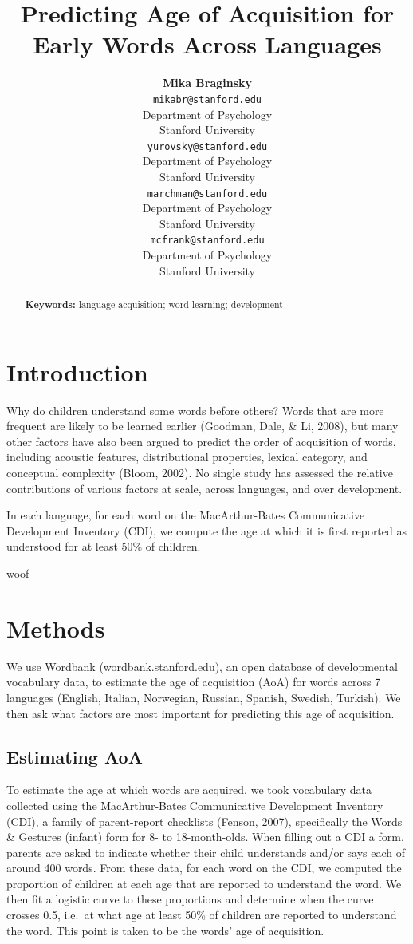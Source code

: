 \documentclass[10pt, letterpaper]{article}
\title{Predicting Age of Acquisition for Early Words Across Languages}
\author{{\large \bf Mika Braginsky} \\ \texttt{mikabr@stanford.edu} \\ Department of Psychology \\ Stanford University \And {\large \bf Daniel Yurovsky} \\ \texttt{yurovsky@stanford.edu} \\ Department of Psychology \\ Stanford University \And {\large \bf Virginia A. Marchman} \\ \texttt{marchman@stanford.edu} \\ Department of Psychology \\ Stanford University \And {\large \bf Michael C. Frank} \\ \texttt{mcfrank@stanford.edu} \\ Department of Psychology \\ Stanford University}
\begin{document}
\maketitle

\begin{abstract}


\textbf{Keywords:}
language acquisition; word learning; development
\end{abstract}

\section{Introduction}\label{introduction}

Why do children understand some words before others? Words that are more
frequent are likely to be learned earlier (Goodman, Dale, \& Li, 2008),
but many other factors have also been argued to predict the order of
acquisition of words, including acoustic features, distributional
properties, lexical category, and conceptual complexity (Bloom, 2002).
No single study has assessed the relative contributions of various
factors at scale, across languages, and over development.

In each language, for each word on the MacArthur-Bates Communicative
Development Inventory (CDI), we compute the age at which it is first
reported as understood for at least 50\% of children.

\newpage

woof

\newpage

\section{Methods}\label{methods}

We use Wordbank (wordbank.stanford.edu), an open database of
developmental vocabulary data, to estimate the age of acquisition (AoA)
for words across 7 languages (English, Italian, Norwegian, Russian,
Spanish, Swedish, Turkish). We then ask what factors are most important
for predicting this age of acquisition.

\subsection{Estimating AoA}\label{estimating-aoa}

To estimate the age at which words are acquired, we took vocabulary data
collected using the MacArthur-Bates Communicative Development Inventory
(CDI), a family of parent-report checklists (Fenson, 2007), specifically
the Words \& Gestures (infant) form for 8- to 18-month-olds. When
filling out a CDI a form, parents are asked to indicate whether their
child understands and/or says each of around 400 words. From these data,
for each word on the CDI, we computed the proportion of children at each
age that are reported to understand the word. We then fit a logistic
curve to these proportions and determine when the curve crosses 0.5,
i.e.~at what age at least 50\% of children are reported to understand
the word. This point is taken to be the words' age of acquisition.
\end{document}
